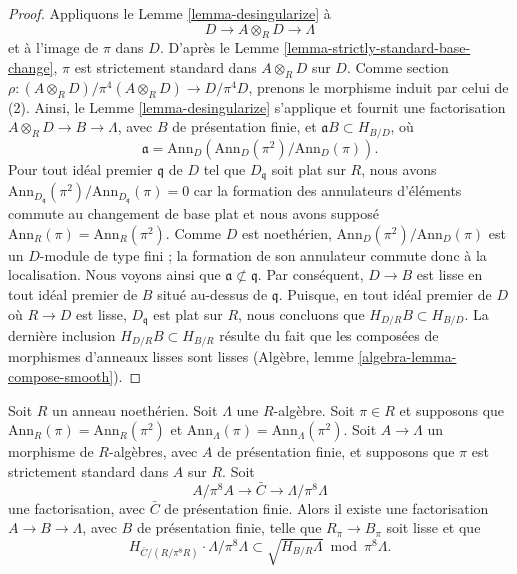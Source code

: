 \begin{proof}
Appliquons le Lemme \ref{lemma-desingularize} à
$$
D \longrightarrow A \otimes_R D \longrightarrow \Lambda
$$
et à l'image de $\pi$ dans $D$. D'après le
Lemme \ref{lemma-strictly-standard-base-change},
$\pi$ est strictement standard dans $A \otimes_R D$ sur $D$.
Comme section $\rho : (A \otimes_R D)/\pi^4 (A \otimes_R D) \to D/\pi^4 D$,
prenons le morphisme induit par celui de (2). Ainsi, le
Lemme \ref{lemma-desingularize} s'applique et fournit une factorisation
$A \otimes_R D \to B \to \Lambda$, avec $B$ de présentation finie,
et $\mathfrak a B \subset H_{B/D}$, où
$$
\mathfrak a = \text{Ann}_D(\text{Ann}_D(\pi^2)/\text{Ann}_D(\pi)).
$$
Pour tout idéal premier $\mathfrak q$ de $D$ tel que $D_\mathfrak q$ soit plat sur $R$,
nous avons
$\text{Ann}_{D_\mathfrak q}(\pi^2)/\text{Ann}_{D_\mathfrak q}(\pi) = 0$
car la formation des annulateurs d'éléments commute au changement de base plat et
nous avons supposé $\text{Ann}_R(\pi) = \text{Ann}_R(\pi^2)$. Comme $D$ est
noethérien, $\text{Ann}_D(\pi^2)/\text{Ann}_D(\pi)$ est un
$D$-module de type fini ; la formation de son annulateur commute donc à la localisation.
Nous voyons ainsi que $\mathfrak a \not \subset \mathfrak q$. Par conséquent,
$D \to B$ est lisse en tout idéal premier de $B$ situé au-dessus de $\mathfrak q$.
Puisque, en tout idéal premier de $D$ où $R \to D$ est lisse,
$D_\mathfrak q$ est plat sur $R$, nous concluons que $H_{D/R}B \subset H_{B/D}$.
La dernière inclusion $H_{D/R}B \subset H_{B/R}$ résulte du fait que les composées
de morphismes d'anneaux lisses sont lisses
(Algèbre, lemme \ref{algebra-lemma-compose-smooth}).
\end{proof}

\begin{lemma}
\label{lemma-desingularize-lifting-apply}
Soit $R$ un anneau noethérien. Soit $\Lambda$ une $R$-algèbre.
Soit $\pi \in R$ et supposons que $\text{Ann}_R(\pi) = \text{Ann}_R(\pi^2)$ et
$\text{Ann}_\Lambda(\pi) = \text{Ann}_\Lambda(\pi^2)$.
Soit $A \to \Lambda$ un morphisme de $R$-algèbres, avec
$A$ de présentation finie, et supposons que $\pi$ est strictement standard
dans $A$ sur $R$. Soit
$$
A/\pi^8A \to \bar C \to \Lambda/\pi^8\Lambda
$$
une factorisation, avec $\bar C$ de présentation finie.
Alors il existe une factorisation $A \to B \to \Lambda$, avec $B$ de
présentation finie, telle que $R_\pi \to B_\pi$ soit lisse et que
$$
H_{\bar C/(R/\pi^8 R)} \cdot \Lambda/\pi^8\Lambda
\subset
\sqrt{H_{B/R} \Lambda} \bmod \pi^8\Lambda.
$$
\end{lemma}

